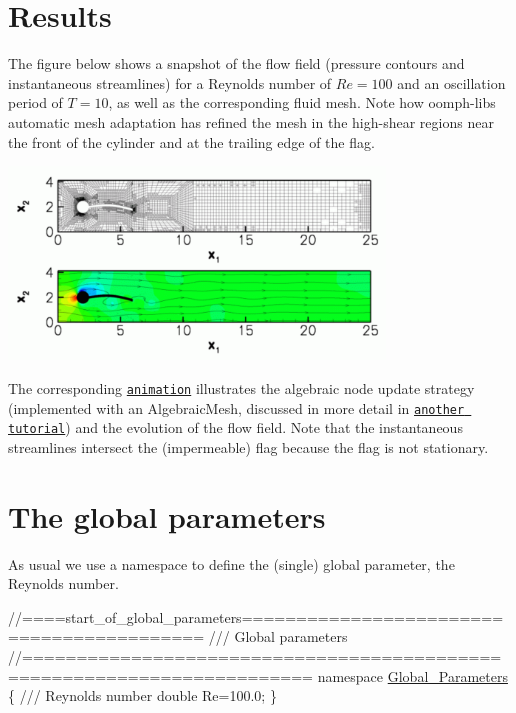  

\hypertarget{index_results}{}\section{Results}\label{index_results}
The figure below shows a snapshot of the flow field (pressure contours and instantaneous streamlines) for a Reynolds number of $ Re=100 $ and an oscillation period of $ T= 10 $, as well as the corresponding fluid mesh. Note how {\ttfamily oomph-\/lib\textquotesingle{}s} automatic mesh adaptation has refined the mesh in the high-\/shear regions near the front of the cylinder and at the trailing edge of the flag.

 
\begin{DoxyImage}
\includegraphics[width=0.75\textwidth]{flow_cropped}
\end{DoxyImage}


The corresponding \href{../figures/turek_flag_non_fsi.avi}{\tt animation} illustrates the algebraic node update strategy (implemented with an {\ttfamily Algebraic\+Mesh}, discussed in more detail in \href{../../algebraic_collapsible_channel/html/index.html}{\tt another tutorial}) and the evolution of the flow field. Note that the instantaneous streamlines intersect the (impermeable) flag because the flag is not stationary.



 

\hypertarget{index_parameters}{}\section{The global parameters}\label{index_parameters}
As usual we use a namespace to define the (single) global parameter, the Reynolds number.

 
\begin{DoxyCodeInclude}
\textcolor{comment}{//====start\_of\_global\_parameters==========================================}
\textcolor{comment}{/// Global parameters}
\textcolor{comment}{}\textcolor{comment}{//========================================================================}
\textcolor{keyword}{namespace }\hyperlink{namespaceGlobal__Parameters}{Global\_Parameters}
\{\textcolor{comment}{}
\textcolor{comment}{ /// Reynolds number}
\textcolor{comment}{} \textcolor{keywordtype}{double} Re=100.0;
\}

\end{DoxyCodeInclude}




